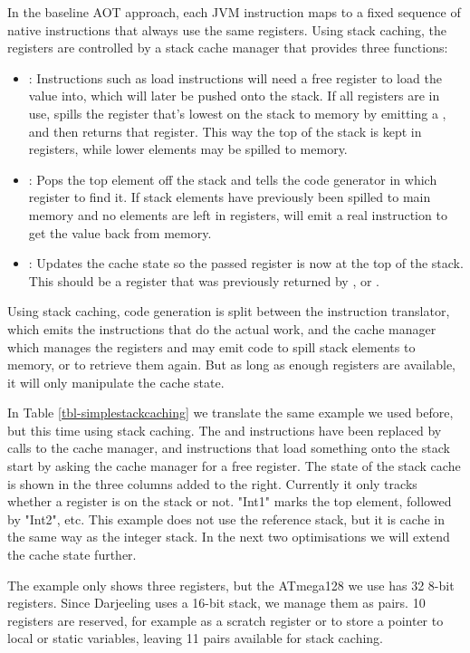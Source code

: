 In the baseline AOT approach, each JVM instruction maps to a fixed sequence of native instructions that always use the same registers. Using stack caching, the registers are controlled by a stack cache manager that provides three functions:
\begin{itemize}
    \item {}: Instructions such as load instructions will need a free register to load the value into, which will later be pushed onto the stack. If all registers are in use,  spills the register that's lowest on the stack to memory by emitting a , and then returns that register. This way the top of the stack is kept in registers, while lower elements may be spilled to memory.
    \item {}: Pops the top element off the stack and tells the code generator in which register to find it. If stack elements have previously been spilled to main memory and no  elements are left in registers,  will emit a real  instruction to get the value back from memory.
    \item {}: Updates the cache state so the passed register is now at the top of the stack. This should be a register that was previously returned by , or .
\end{itemize}

Using stack caching, code generation is split between the instruction translator, which emits the instructions that do the actual work, and the cache manager which manages the registers and may emit code to spill stack elements to memory, or to retrieve them again. But as long as enough registers are available, it will only manipulate the cache state.

In Table \ref{tbl-simplestackcaching} we translate the same example we used before, but this time using stack caching. The  and  instructions have been replaced by calls to the cache manager, and instructions that load something onto the stack start by asking the cache manager for a free register. The state of the stack cache is shown in the three columns added to the right. Currently it only tracks whether a register is on the stack or not. "Int1" marks the top element, followed by "Int2", etc. This example does not use the reference stack, but it is cache in the same way as the integer stack. In the next two optimisations we will extend the cache state further.
 
The example only shows three registers, but the ATmega128 we use has 32 8-bit registers. Since Darjeeling uses a 16-bit stack, we manage them as pairs. 10 registers are reserved, for example as a scratch register or to store a pointer to local or static variables, leaving 11 pairs available for stack caching.

